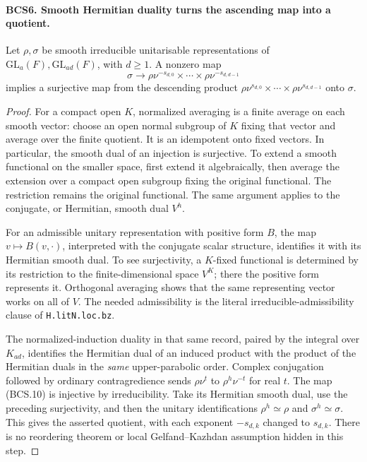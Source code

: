 \paragraph{BCS6. Smooth Hermitian duality turns the ascending map into a quotient.}
\label{claim:BCS6}
Let \(\rho,\sigma\) be smooth irreducible unitarisable
representations of \(\mathrm{GL}_a(F),\mathrm{GL}_{ad}(F)\), with
\(d\ge1\).  A nonzero map
\[
 \sigma\longrightarrow
       \rho\nu^{-s_{d,0}}\times\cdots\times\rho\nu^{-s_{d,d-1}}
 \tag{BCS.10}
\]
implies a surjective map from the descending product
\(\rho\nu^{s_{d,0}}\times\cdots\times\rho\nu^{s_{d,d-1}}\)
onto \(\sigma\).
\begin{proof}
For a compact open \(K\), normalized averaging is a finite average
on each smooth vector: choose an open normal subgroup of \(K\)
fixing that vector and average over the finite quotient.  It is an
idempotent onto fixed vectors.  In particular, the smooth dual of an
injection is surjective.  To extend a smooth functional on the smaller
space, first extend it algebraically, then average the extension over
a compact open subgroup fixing the original functional.  The
restriction remains the original functional.  The same argument
applies to the conjugate, or Hermitian, smooth dual \(V^h\).

For an admissible unitary representation with positive form \(B\),
the map \(v\mapsto B(v,\cdot)\), interpreted with the conjugate
scalar structure, identifies it with its Hermitian smooth dual.  To
see surjectivity, a \(K\)-fixed functional is determined by its
restriction to the finite-dimensional space \(V^K\); there the
positive form represents it.  Orthogonal averaging shows that the
same representing vector works on all of \(V\).  The needed
admissibility is the literal irreducible-admissibility clause of
\texttt{H.litN.loc.bz}.

The normalized-induction duality in that same record, paired by the
integral over \(K_{ad}\), identifies the Hermitian dual of an induced
product with the product of the Hermitian duals in the \emph{same}
upper-parabolic order.  Complex conjugation followed by ordinary
contragredience sends \(\rho\nu^t\) to
\(\rho^h\nu^{-t}\) for real \(t\).
The map (BCS.10) is injective by irreducibility.  Take its Hermitian
smooth dual, use the preceding surjectivity, and then the unitary
identifications \(\rho^h\simeq\rho\) and
\(\sigma^h\simeq\sigma\).  This gives the asserted quotient,
with each exponent \(-s_{d,k}\) changed to \(s_{d,k}\).
There is no reordering theorem or local Gelfand--Kazhdan assumption
hidden in this step.
\end{proof}

